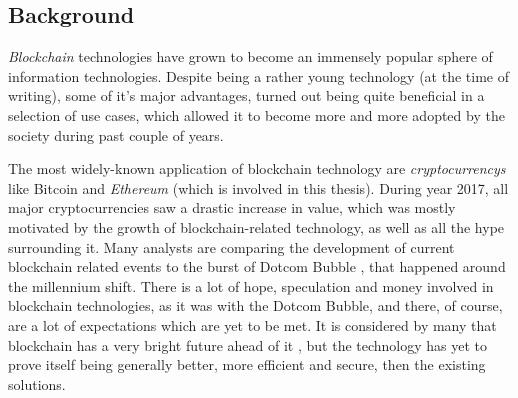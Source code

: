 \subsection{Background}
\emph{\Gls{Blockchain}} technologies have grown to become an immensely popular sphere of information technologies. Despite being a rather young technology (at the time of writing), some of it's major advantages, turned out being quite beneficial in a selection of use cases, which allowed it to become more and more adopted by the society during past couple of years.

The most widely-known application of blockchain technology are \emph{\glspl{cryptocurrency}} like Bitcoin \citep{bitcoinwhitepaper} and \emph{\Gls{Ethereum}} \citep{buterin2013ethereum} (which is involved in this thesis). During year 2017, all major cryptocurrencies saw a drastic increase in value, which was mostly motivated by the growth of blockchain-related technology, as well as all the hype surrounding it. Many analysts are comparing the development of current blockchain related events to the burst of Dotcom Bubble \citep{dotcombubble}, that happened around the millennium shift. There is a lot of hope, speculation and money involved in blockchain technologies, as it was with the Dotcom Bubble, and there, of course, are a lot of expectations which are yet to be met. It is considered by many that blockchain has a very bright future ahead of it \citep{blockchaingreatestinvention}, but the technology has yet to prove itself being generally better, more efficient and secure, then the existing solutions.

